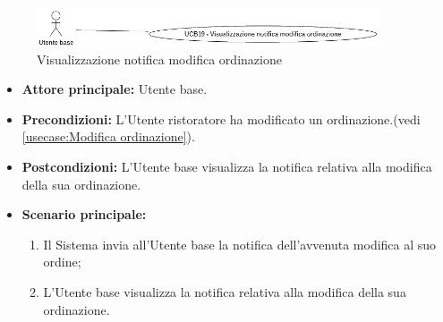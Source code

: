 \label{usecase:Visualizzazione notifica modifica ordinazione}

\begin{figure}[h]
	\centering
	\includegraphics[width=0.9\textwidth]{./uml/UCB19.png} 
	\caption{Visualizzazione notifica modifica ordinazione}
	\label{fig:UCB18}
  \end{figure}

\begin{itemize}
	\item \textbf{Attore principale:} Utente base.

	\item \textbf{Precondizioni:} L'Utente ristoratore ha modificato un ordinazione.(vedi \autoref{usecase:Modifica ordinazione}).

	\item \textbf{Postcondizioni:} L'Utente base visualizza la notifica relativa alla modifica della sua ordinazione.

	\item \textbf{Scenario principale:}
	      \begin{enumerate}
		      \item Il Sistema invia all'Utente base la notifica dell'avvenuta modifica al suo ordine;

		      \item L'Utente base visualizza la notifica relativa alla modifica della sua ordinazione.
	      \end{enumerate}
\end{itemize}
